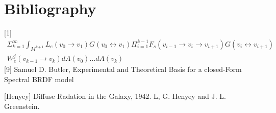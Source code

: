 \documentclass{article}
\begin{document}
  \section{Bibliography}
  [1]
  \begin{align*}
    \Sigma_{k=1}^{\infty} \int_{M^{k+1}} L_e(v_0 \rightarrow v_1) G(v_0
    \leftrightarrow v_1)
    \Pi_{i=1}^{k-1} F_s(v_{i-1} \rightarrow v_i \rightarrow v_{i+1}) G(v_i
    \leftrightarrow v_{i+1})\\
    W_e^j(v_{k-1} \rightarrow v_k) dA(v_0) \ldots dA(v_k)
  \end{align*}
  [9]
  Samuel D. Butler, Experimental and Theoretical Basis for a closed-Form Spectral BRDF model
  
  [Henyey]
   Diffuse Radation in the Galaxy, 1942. L, G. Henyey and J. L. Greenstein. 
\end{document}
